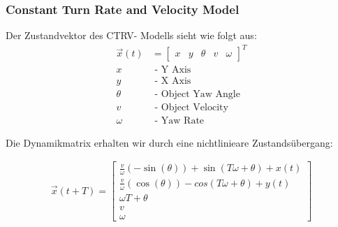 \documentclass[11pt,oneside,openright]{mpreport}
\begin{document}
\subsubsection{Constant Turn Rate and Velocity Model}
Der Zustandvektor \cite{Schubert2008} des CTRV- Modells sieht wie folgt aus:
\begin{align*}
\vec{x}(t) &=
\begin{bmatrix}
x & y & \theta & v & \omega
\end{bmatrix}^T\\
x &\text{ - Y Axis}\\
y &\text{ - X Axis}\\
\theta &\text{ - Object Yaw Angle}\\
v &\text{ - Object Velocity}\\
\omega &\text{ - Yaw Rate}
\end{align*}

Die Dynamikmatrix erhalten wir durch eine nichtlinieare Zustandsübergang:

\begin{align*}
\vec{x}(t + T)=
\begin{bmatrix}
\frac{v}{\omega} (-\sin(\theta)) + \sin(T \omega + \theta) + x(t) \\
\frac{v}{\omega} (\cos(\theta)) - cos(T \omega + \theta) + y(t) \\
\omega T + \theta\\
v\\
\omega
\end{bmatrix} 
\end{align*}

% 
% 
\end{document}
